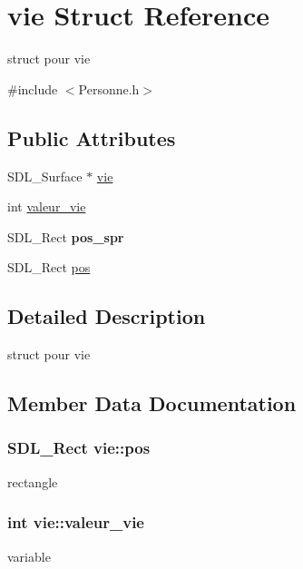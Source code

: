 \hypertarget{structvie}{}\section{vie Struct Reference}
\label{structvie}


struct pour vie  




{\ttfamily \#include $<$Personne.\+h$>$}

\subsection*{Public Attributes}
\begin{DoxyCompactItemize}
\item 
S\+D\+L\+\_\+\+Surface $\ast$ \hyperlink{structvie_a5cfd108ccc19244f76e448b73ea3deb3}{vie}
\item 
int \hyperlink{structvie_a8d10dfe1a564e7bd3dfea1e5e99ac89f}{valeur\+\_\+vie}
\item 
S\+D\+L\+\_\+\+Rect {\bfseries pos\+\_\+spr}\hypertarget{structvie_aab8ef53889e5fea1c627defa0bbab78b}{}\label{structvie_aab8ef53889e5fea1c627defa0bbab78b}

\item 
S\+D\+L\+\_\+\+Rect \hyperlink{structvie_a23e0c05c5a9c6f4a4bae5214ea1bcf24}{pos}
\end{DoxyCompactItemize}


\subsection{Detailed Description}
struct pour vie 

\subsection{Member Data Documentation}
\subsubsection[{\texorpdfstring{pos}{pos}}]{\setlength{\rightskip}{0pt plus 5cm}S\+D\+L\+\_\+\+Rect vie\+::pos}\hypertarget{structvie_a23e0c05c5a9c6f4a4bae5214ea1bcf24}{}\label{structvie_a23e0c05c5a9c6f4a4bae5214ea1bcf24}
rectangle 
\subsubsection[{\texorpdfstring{valeur\+\_\+vie}{valeur_vie}}]{\setlength{\rightskip}{0pt plus 5cm}int vie\+::valeur\+\_\+vie}\hypertarget{structvie_a8d10dfe1a564e7bd3dfea1e5e99ac89f}{}\label{structvie_a8d10dfe1a564e7bd3dfea1e5e99ac89f}
variable 
